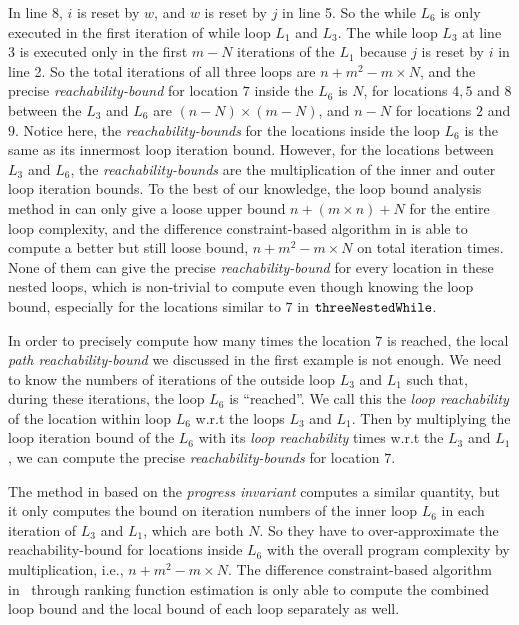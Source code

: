 In line 8, $i$ is reset by $w$, and $w$ is reset by $j$ in line 5. So the
while $L_6$ is only executed in the first iteration of while loop $L_1$ and $L_3$.
The while loop $L_3$ at line 3 is executed only in 
the first $m - N$ iterations of the 
$L_1$ because $j$ is reset by $i$ in line 2.
So the total iterations of all three loops are
$n + m^2 - m \times N$,
and the precise \emph{reachability-bound} for location $7$ inside the $L_6$ is $N$,
for locations $4, 5$ and $8$ between the $L_3$ and $L_6$ are $(n-N) \times (m - N)$,
and $n - N$ for locations $2$ and $9$.
Notice here, the \emph{reachability-bounds} for the locations inside the loop $L_6$ is 
the same as its innermost loop iteration bound.
However, for the locations between $L_3$ and $L_6$,
the \emph{reachability-bounds} are the multiplication of the inner and outer loop iteration bounds.
To the best of our knowledge, the loop bound analysis method in \cite{GulwaniJK09} can only give a loose upper bound $n + (m \times n) + N$ for the entire loop complexity, and 
the difference constraint-based algorithm in \cite{SinnZV17} is able to
compute a better but still loose bound, $n + m^2 - m \times N$ on total iteration times.
None of them can give the precise \emph{reachability-bound} for every location in these nested loops,
which is non-trivial to compute even though knowing the loop bound,
especially for the locations similar to $7$ in $\mathtt{threeNestedWhile}$.

In order to precisely compute how many times the location $7$ is reached, 
the local \emph{path reachability-bound} we discussed in the first example is not enough.
We need to know
the numbers of iterations of the outside loop $L_3$ and $L_1$ such that,
during these iterations, the loop $L_6$ is ``reached''. 
We call this the \emph{loop reachability} of the location within loop $L_6$ w.r.t the loops $L_3$ and $L_1$.
Then by multiplying the loop iteration bound of the $L_6$ with its \emph{loop reachability} times w.r.t the $L_3$ and $L_1$, we can compute the precise
\emph{reachability-bounds} for location $7$.

The method in \cite{GulwaniJK09} based on the \emph{progress invariant} computes a similar quantity, but it only computes
the
bound on iteration numbers
of the inner loop $L_6$ in each iteration of $L_3$ and $L_1$, which are both $N$.
So they have to over-approximate the reachability-bound for locations inside $L_6$ with the
overall program complexity by multiplication, i.e., $n + m^2 - m \times N$.
The difference constraint-based algorithm in~\cite{SinnZV17} through ranking function estimation
is only able to
compute the combined loop bound and the local bound of each loop
separately as well.

